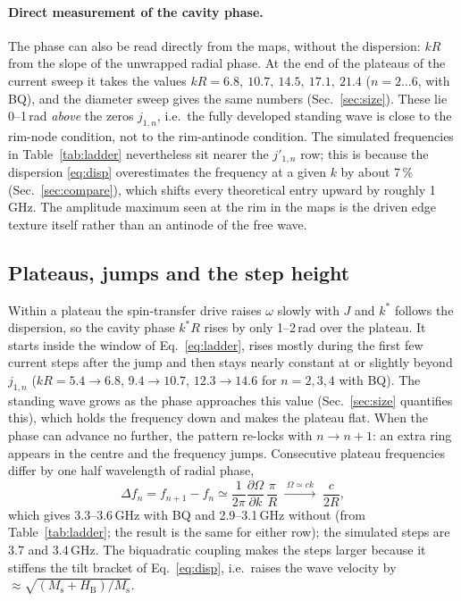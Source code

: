 \documentclass[11pt,a4paper]{article}
\newcommand{\Ms}{M_\mathrm{s}}
\newcommand{\HB}{H_\mathrm{B}}
\begin{document}
\paragraph{Direct measurement of the cavity phase.}
The phase can also be read directly from the maps, without the dispersion: $kR$ from the slope of the unwrapped
radial phase.  At the end of the plateaus of the current sweep it takes the values
$kR=6.8,\ 10.7,\ 14.5,\ 17.1,\ 21.4$ ($n=2\dots6$, with BQ), and the diameter sweep gives the same numbers
(Sec.~\ref{sec:size}).  These lie 0--1\,rad \emph{above} the zeros $j_{1,n}$, i.e.\ the fully developed standing
wave is close to the rim-node condition, not to the rim-antinode condition.  The simulated frequencies in
Table~\ref{tab:ladder} nevertheless sit nearer the $j'_{1,n}$ row; this is because the dispersion
\eqref{eq:disp} overestimates the frequency at a given $k$ by about 7\,\% (Sec.~\ref{sec:compare}), which
shifts every theoretical entry upward by roughly 1\,GHz.  The amplitude maximum seen at the rim in the maps is
the driven edge texture itself rather than an antinode of the free wave.

\subsection{Plateaus, jumps and the step height}
Within a plateau the spin-transfer drive raises $\omega$ slowly with $J$ and $k^\ast$ follows the dispersion,
so the cavity phase $k^\ast R$ rises by only 1--2\,rad over the plateau.  It starts inside the window of
Eq.~\eqref{eq:ladder}, rises mostly during the first few current steps after the jump and then stays nearly
constant at or slightly beyond $j_{1,n}$ ($kR=5.4\to6.8$, $9.4\to10.7$, $12.3\to14.6$ for $n=2,3,4$ with BQ).
The standing wave grows as the phase approaches this value (Sec.~\ref{sec:size} quantifies this), which holds the
frequency down and makes the plateau flat.
When the phase can advance no further, the pattern re-locks with $n\to n+1$: an extra ring appears in the centre
and the frequency jumps.  Consecutive plateau frequencies differ by one half wavelength of radial phase,
\begin{equation}
\Delta f_n=f_{n+1}-f_n\simeq\frac{1}{2\pi}\frac{\partial\Omega}{\partial k}\,\frac{\pi}{R}
\;\xrightarrow{\ \Omega\simeq ck\ }\;\frac{c}{2R},
\label{eq:step}
\end{equation}
which gives 3.3--3.6\,GHz with BQ and 2.9--3.1\,GHz without (from Table~\ref{tab:ladder}; the result is the same
for either row); the simulated steps are 3.7 and 3.4\,GHz.  The biquadratic coupling makes the steps larger
because it stiffens the tilt bracket of Eq.~\eqref{eq:disp}, i.e.\ raises the wave velocity by
$\approx\sqrt{(\Ms+\HB)/\Ms}$.
\end{document}
